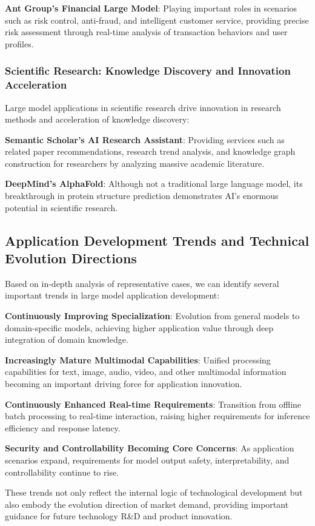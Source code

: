 \documentclass{article}
\begin{document}
\textbf{Ant Group's Financial Large Model}: Playing important roles in scenarios such as risk control, anti-fraud, and intelligent customer service, providing precise risk assessment through real-time analysis of transaction behaviors and user profiles.

\subsubsection{Scientific Research: Knowledge Discovery and Innovation Acceleration}
Large model applications in scientific research drive innovation in research methods and acceleration of knowledge discovery:

\textbf{Semantic Scholar's AI Research Assistant}: Providing services such as related paper recommendations, research trend analysis, and knowledge graph construction for researchers by analyzing massive academic literature.

\textbf{DeepMind's AlphaFold}: Although not a traditional large language model, its breakthrough in protein structure prediction demonstrates AI's enormous potential in scientific research.

\subsection{Application Development Trends and Technical Evolution Directions}
Based on in-depth analysis of representative cases, we can identify several important trends in large model application development:

\textbf{Continuously Improving Specialization}: Evolution from general models to domain-specific models, achieving higher application value through deep integration of domain knowledge.

\textbf{Increasingly Mature Multimodal Capabilities}: Unified processing capabilities for text, image, audio, video, and other multimodal information becoming an important driving force for application innovation.

\textbf{Continuously Enhanced Real-time Requirements}: Transition from offline batch processing to real-time interaction, raising higher requirements for inference efficiency and response latency.

\textbf{Security and Controllability Becoming Core Concerns}: As application scenarios expand, requirements for model output safety, interpretability, and controllability continue to rise.

These trends not only reflect the internal logic of technological development but also embody the evolution direction of market demand, providing important guidance for future technology R\&D and product innovation. 
\end{document}
